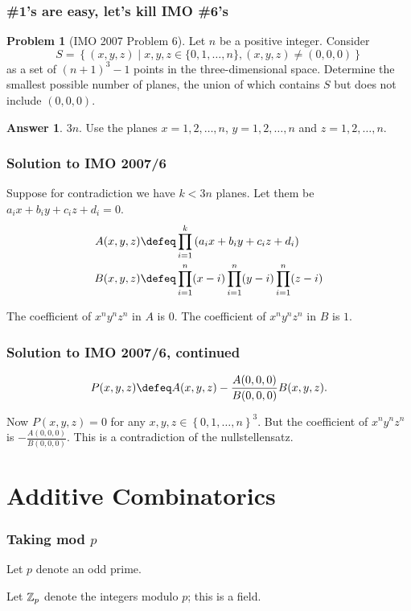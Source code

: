 \documentclass{beamer}
\theoremstyle{definition}
\newtheorem{problem*}{Problem}
\newtheorem{answer*}{Answer}
\begin{document}
\begin{frame}
  \frametitle{\#1's are easy, let's kill IMO \#6's}
  \begin{problem*}[IMO 2007 Problem 6]
    Let $n$ be a positive integer. Consider \[ S = \left\{ (x,y,z) \mid x,y,z \in \{ 0, 1, \ldots, n\}, (x,y,z) \neq (0,0,0) \right \} \] as a set of $(n + 1)^{3} - 1$ points in the three-dimensional space. Determine the smallest possible number of planes, the union of which contains $S$ but does not include $(0,0,0)$.
  \end{problem*}
  \pause
  \begin{answer*}
    $3n$.  Use the planes $x=1,2,\dots,n$, $y=1,2,\dots,n$ and $z=1,2,\dots,n$.
  \end{answer*}
\end{frame}

\begin{frame}
  \frametitle{Solution to IMO 2007/6}
  Suppose for contradiction we have $k < 3n$ planes.
  Let them be $a_ix+b_iy+c_iz+d_i=0$. \pause
  \begin{align*}
    A(x,y,z) &\defeq \prod_{i=1}^k \left( a_ix + b_iy + c_iz + d_i \right) \\
    B(x,y,z) &\defeq \prod_{i=1}^n (x-i) \prod_{i=1}^n (y-i) \prod_{i=1}^n (z-i)
  \end{align*}
  \pause
  \begin{itemize}
    \ii The coefficient of $x^ny^nz^n$ in $A$ is $0$.
    \ii The coefficient of $x^ny^nz^n$ in $B$ is $1$.
  \end{itemize}
\end{frame}
\begin{frame}
  \frametitle{Solution to IMO 2007/6, continued}
  \[ P(x,y,z) \defeq A(x,y,z) - \frac{A(0,0,0)}{B(0,0,0)} B(x,y,z). \]
  \begin{itemize}
    \ii Now $P(x,y,z) = 0$ for any $x,y,z \in \left\{ 0,1,\dots,n \right\}^3$. \pause
    \ii But the coefficient of $x^ny^nz^n$ is $-\frac{A(0,0,0)}{B(0,0,0)}$.
    \ii This is a contradiction of the nullstellensatz.
  \end{itemize}
\end{frame}

\section{Additive Combinatorics}
\begin{frame}
  \frametitle{Taking mod $p$}
  Let $p$ denote an odd prime.

  Let $\mathbb Z_p$ denote the integers modulo $p$; this is a field.
\end{frame}
\end{document}
